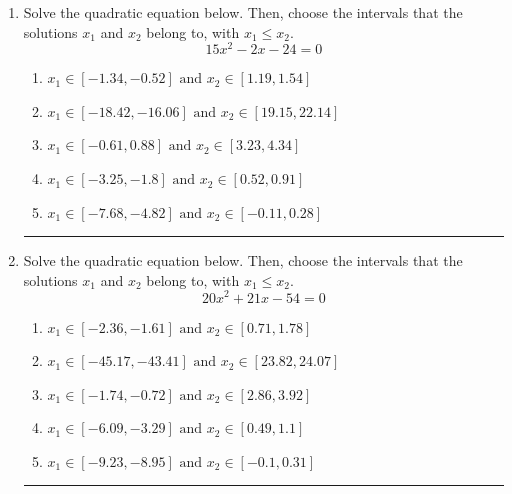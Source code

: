 \documentclass[14pt]{extbook}
\newcommand{\litem}[1]{\item#1\hspace*{-1cm}\rule{\textwidth}{0.4pt}}
\begin{document}
\begin{enumerate}
{\begin{enumerate}[label=\Alph*.]
\end{enumerate} }
\litem{
Solve the quadratic equation below. Then, choose the intervals that the solutions $x_1$ and $x_2$ belong to, with $x_1 \leq x_2$.\[ 15x^{2} -2 x -24 = 0 \]\begin{enumerate}[label=\Alph*.]
\item \( x_1 \in [-1.34, -0.52] \text{ and } x_2 \in [1.19, 1.54] \)
\item \( x_1 \in [-18.42, -16.06] \text{ and } x_2 \in [19.15, 22.14] \)
\item \( x_1 \in [-0.61, 0.88] \text{ and } x_2 \in [3.23, 4.34] \)
\item \( x_1 \in [-3.25, -1.8] \text{ and } x_2 \in [0.52, 0.91] \)
\item \( x_1 \in [-7.68, -4.82] \text{ and } x_2 \in [-0.11, 0.28] \)

\end{enumerate} }
\litem{
Solve the quadratic equation below. Then, choose the intervals that the solutions $x_1$ and $x_2$ belong to, with $x_1 \leq x_2$.\[ 20x^{2} +21 x -54 = 0 \]\begin{enumerate}[label=\Alph*.]
\item \( x_1 \in [-2.36, -1.61] \text{ and } x_2 \in [0.71, 1.78] \)
\item \( x_1 \in [-45.17, -43.41] \text{ and } x_2 \in [23.82, 24.07] \)
\item \( x_1 \in [-1.74, -0.72] \text{ and } x_2 \in [2.86, 3.92] \)
\item \( x_1 \in [-6.09, -3.29] \text{ and } x_2 \in [0.49, 1.1] \)
\item \( x_1 \in [-9.23, -8.95] \text{ and } x_2 \in [-0.1, 0.31] \)


\end{enumerate}}
\end{enumerate}
\end{document}
